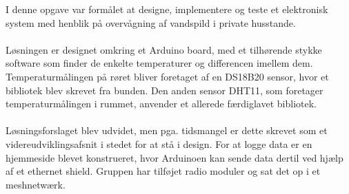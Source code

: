 I denne opgave var formålet at designe, implementere og teste et elektronisk system med henblik på overvågning af vandspild i private husstande.
\\
\\
Løsningen er designet omkring et Arduino board, med et tilhørende stykke software som finder de enkelte temperaturer og differencen imellem dem. Temperaturmålingen på røret bliver foretaget af en DS18B20 sensor, hvor et bibliotek blev skrevet fra bunden. Den anden sensor DHT11, som foretager temperaturmålingen i rummet, anvender et allerede færdiglavet bibliotek.
\\
\\
Løsningsforslaget blev udvidet, men pga. tidsmangel er dette skrevet som et videreudviklingsafsnit i stedet for at stå i design. 
For at logge data er en hjemmeside blevet konstrueret, hvor Arduinoen kan sende data dertil ved hjælp af et ethernet shield.
Gruppen har tilføjet radio moduler og sat det op i  et meshnetwærk.




